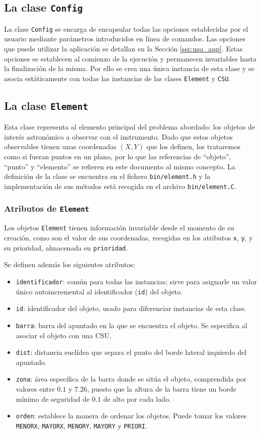 \subsection{La clase \texttt{Config}}
La clase \texttt{Config} se encarga de encapsular todas las opciones
establecidas por el usuario mediante parámetros introducidos en línea de comandos. 
Las opciones que puede utilizar la aplicación se detallan en la Sección
\ref{sec:uso_app}. Estas opciones se establecen al comienzo de la ejecución y
permanecen invariables hasta la finalización de la misma. Por ello se crea una
única instancia de esta clase y se asocia estáticamente con todas las instancias
de las clases \texttt{Element} y \texttt{CSU}.
\subsection{La clase \texttt{Element}}
Esta clase representa al elemento principal del problema abordado: 
los objetos de interés astronómico a observar con el instrumento. Dado
que estos objetos observables tienen unas coordenadas $(X, Y)$ que los
definen, los trataremos como si fueran puntos en un plano, por lo que las
referencias de ``objeto'', ``punto'' y ``elemento'' se refieren en este
documento al mismo concepto. La definición de la clase se encuentra en el fichero
\texttt{bin/element.h} y la implementación de sus métodos está recogida en el
archivo \texttt{bin/element.C}.

\subsubsection{Atributos de \texttt{Element}}
Los objetos \texttt{Element} tienen información invariable desde el momento de su creación, como son
el valor de sus coordenadas, recogidas en los atributos \texttt{x}, \texttt{y},
y su prioridad, almacenada en \texttt{prioridad}. 

Se definen además los siguientes atributos:
\begin{itemize}
\item \texttt{identificador}: común para todas las instancias; sirve para
asignarle un valor único autoincremental al identificador (\texttt{id}) del objeto.
\item \texttt{id}: identificador del objeto, usado para diferenciar instancias de esta clase.
\item \texttt{barra}: barra del apuntado en la que se encuentra el objeto. Se
especifica al asociar el objeto con una CSU.
\item \texttt{dist}: distancia euclídea que separa el punto del borde lateral
izquierdo del apuntado.
\item \texttt{zona}: área específica de la barra donde se sitúa el objeto,
comprendida por valores entre $0.1$ y $7.26$, puesto que la altura de la barra
tiene un borde mínimo de seguridad de $0.1$ de alto por cada lado.
\item \texttt{orden}: establece la manera de ordenar los objetos. Puede tomar
los valores \texttt{MENORX}, \texttt{MAYORX}, \texttt{MENORY}, \texttt{MAYORY} y
\texttt{PRIORI}. 
\end{itemize}
